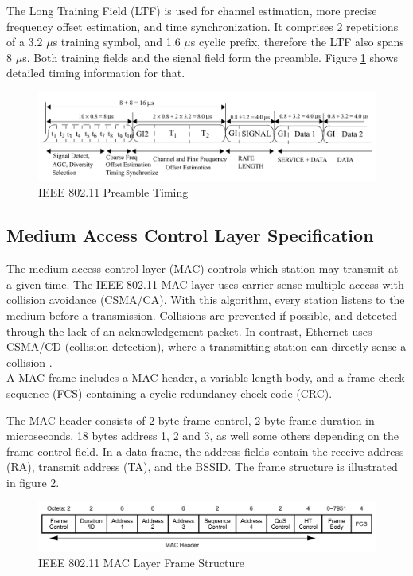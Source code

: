 The Long Training Field (LTF) is used for channel estimation, more precise frequency offset estimation, and time synchronization. It comprises 2 repetitions of a 3.2 $\mu$s training symbol, and 1.6 $\mu$s cyclic prefix, therefore the LTF also spans 8 $\mu$s. Both training fields and the signal field form the preamble. Figure \ref{fig:preamble} shows detailed timing information for that.

\begin{figure}[H]
	\centering
	\includegraphics[width=\textwidth]{gfx/images/preamble-format}
	\caption[IEEE 802.11 Preamble Timing]{IEEE 802.11 Preamble Timing \cite{ieee2012}}
	\label{fig:preamble}
\end{figure}


\subsection{Medium Access Control Layer Specification} \label{sec:mac-format}

The medium access control layer (MAC) controls which station may transmit at a given time. The IEEE 802.11 MAC layer uses carrier sense multiple access with collision avoidance (CSMA/CA). With this algorithm, every station listens to the medium before a transmission. Collisions are prevented if possible, and detected through the lack of an acknowledgement packet. In contrast, Ethernet uses CSMA/CD (collision detection), where a transmitting station can directly sense a collision \cite{NEEDED}.\\

A MAC frame includes a MAC header, a variable-length body, and a frame check sequence (FCS) containing a cyclic redundancy check code (CRC).

The MAC header consists of 2 byte frame control, 2 byte frame duration in microseconds, 18 bytes address 1, 2 and 3, as well some others depending on the frame control field. In a data frame, the address fields contain the receive address (RA), transmit address (TA), and the BSSID. The frame structure is illustrated in figure \ref{fig:mac-format}.

\begin{figure}[H]
	\centering
	\includegraphics[width=\textwidth]{gfx/images/mac-format}
	\caption[IEEE 802.11 MAC Layer Frame Structure]{IEEE 802.11 MAC Layer Frame Structure \cite{ieee2012}}
	\label{fig:mac-format}
\end{figure}


